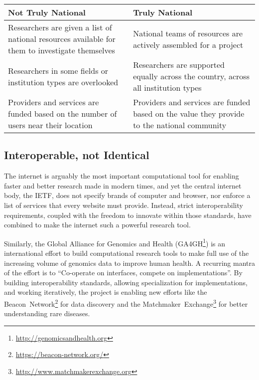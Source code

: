 \documentclass[11pt]{article}
\begin{document}
\begin{table}[ht]
\centering
\small {\sffamily
{}
\begin{tabular}{p{2.5in}|p{2.5in}}
\textcolor{cdaRed}{\textbf{Not Truly National}} & \textcolor{cdaRed}{\textbf{Truly National}} \\
\hline
\hline
Researchers are given a list of national resources available for them to investigate themselves & National teams of resources are actively assembled for a project  \\
Researchers in some fields or institution types are overlooked & Researchers are supported equally across the country, across all institution types \\
Providers and services are funded based on the number of users near their location & Providers and services are funded based on the value they provide to the national community \\
\hline
\end{tabular}
}
\end{table}

\subsection*{Interoperable, not Identical}

The internet is arguably the most important computational tool for
enabling faster and better research made in modern times, and yet the central
internet body, the IETF, does not specify brands of computer and
browser, nor enforce a list of services that every website must
provide.  Instead, strict interoperability requirements, coupled
with the freedom to innovate within those standards, have combined
to make the internet such a powerful research tool.

Similarly, the Global Alliance for Genomics and Health
(GA4GH\footnote{\url{http://genomicsandhealth.org}}) is an international
effort to build computational research tools to make full use of
the increasing volume of genomics data to improve human health.
A recurring mantra of the effort is to \enquote{Co-operate on interfaces,
compete on implementations}.  By building interoperability standards,
allowing specialization for implementations, and working iteratively,
the project is enabling new efforts like the Beacon~Network\footnote{\url{https://beacon-network.org/}}
for data discovery and the Matchmaker~Exchange\footnote{\url{http://www.matchmakerexchange.org}}
for better understanding rare diseases.
\end{document}
